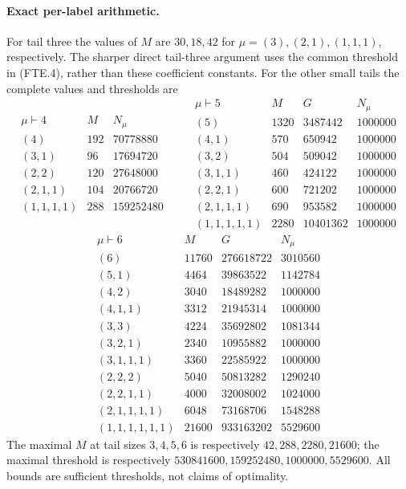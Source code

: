 \paragraph{Exact per-label arithmetic.}
For tail three the values of \(M\) are \(30,18,42\) for
\(\mu=(3),(2,1),(1,1,1)\), respectively.  The sharper direct
tail-three argument uses the common threshold in (FTE.4), rather
than these coefficient constants.  For the other small tails the
complete values and thresholds are
\[
\begin{array}{c|r|r}
\mu\vdash4&M&N_\mu\\\hline
(4)&192&70778880\\
(3,1)&96&17694720\\
(2,2)&120&27648000\\
(2,1,1)&104&20766720\\
(1,1,1,1)&288&159252480
\end{array}
\qquad
\begin{array}{c|r|r|r}
\mu\vdash5&M&G&N_\mu\\\hline
(5)&1320&3487442&1000000\\
(4,1)&570&650942&1000000\\
(3,2)&504&509042&1000000\\
(3,1,1)&460&424122&1000000\\
(2,2,1)&600&721202&1000000\\
(2,1,1,1)&690&953582&1000000\\
(1,1,1,1,1)&2280&10401362&1000000
\end{array}
 \tag{FTE.8}
\]
\[
\begin{array}{c|r|r|r}
\mu\vdash6&M&G&N_\mu\\\hline
(6)&11760&276618722&3010560\\
(5,1)&4464&39863522&1142784\\
(4,2)&3040&18489282&1000000\\
(4,1,1)&3312&21945314&1000000\\
(3,3)&4224&35692802&1081344\\
(3,2,1)&2340&10955882&1000000\\
(3,1,1,1)&3360&22585922&1000000\\
(2,2,2)&5040&50813282&1290240\\
(2,2,1,1)&4000&32008002&1024000\\
(2,1,1,1,1)&6048&73168706&1548288\\
(1,1,1,1,1,1)&21600&933163202&5529600
\end{array}
 \tag{FTE.9}
\]
The maximal \(M\) at tail sizes \(3,4,5,6\) is respectively
\(42,288,2280,21600\); the maximal threshold is respectively
\(530841600,159252480,1000000,5529600\).
All bounds are sufficient thresholds, not claims of optimality.

